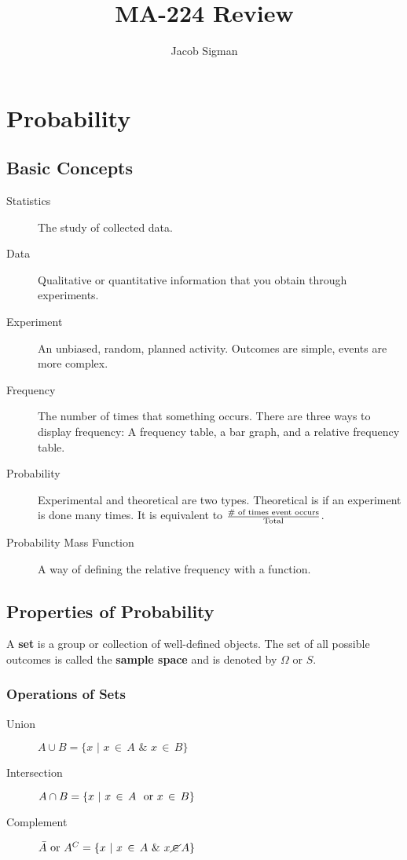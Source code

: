 \documentclass{article}
\title{MA-224 Review}
\author{Jacob Sigman}
\date{}
\begin{document}
\maketitle
\tableofcontents
\newpage
\section{Probability}
\subsection{Basic Concepts}
\begin{description}
\item[Statistics] The study of collected data.
\item[Data] Qualitative or quantitative information that you obtain through experiments.
\item[Experiment] An unbiased, random, planned activity. Outcomes are simple, events are more complex.
\item[Frequency] The number of times that something occurs. There are three ways to display frequency: A frequency table, a bar graph, and a relative frequency table.
\item[Probability] Experimental and theoretical are two types. Theoretical is if an experiment is done many times. It is equivalent to \(\frac{\textnormal{\# of times event occurs}}{\textnormal{Total}}\).
\item[Probability Mass Function] A way of defining the relative frequency with a function.
\end{description}
\subsection{Properties of Probability}
A \textbf{set} is a group or collection of well-defined objects. The set of all possible outcomes is called the \textbf{sample space} and is denoted by \(\Omega\) or \(S\).
\subsubsection*{Operations of Sets}
\begin{description}
\item[Union] \(A \cup B=\{x\,\,|\,\,x\,\in\,A\,\,\&\,\,x\,\in\,B\}\)
\item[Intersection] \(A \cap B=\{x\,\,|\,\,x\,\in\,A\,\,\ \textnormal{or}\,\,x\,\in\,B\}\)
\item[Complement] \(\bar{A} \textnormal{ or } A^C=\{x\,\,|\,\,x\,\in\,A\,\,\&\,\,x\,\cancel{\in}\,A\}\)
\end{description}
\end{document}
